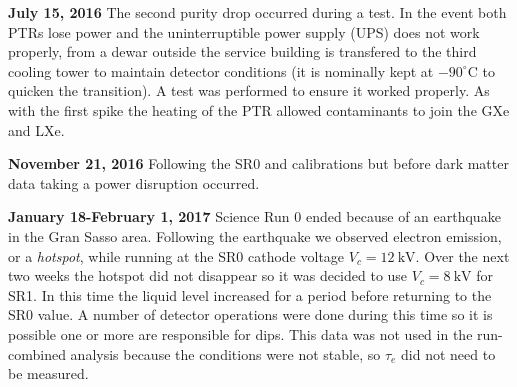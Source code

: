 \textbf{July 15, 2016}  The second purity drop occurred during a \lntwo test.  In the event both PTRs lose power and the uninterruptible
power supply
(UPS) does not work properly, \lntwo from a dewar outside the service building is transfered to the third cooling tower to maintain
detector conditions (it is nominally kept at $-90^{\circ}\mathrm{C}$ to quicken the transition).  A test was performed to ensure it
worked properly.  As with the first spike the heating of the PTR allowed contaminants to join the GXe and LXe.

\begin{table}
\centering
{}
\caption{Purity drops over the lifetime of XENON1T.  Dates and expected causes are listed, along with the detector region (GXe or LXe)
in which the impurity release is thought to occur.  Possible causes and the change in $\tau_e$ from $\alpha$ measurements are given.}
\label{tab:electron_lifetime_model_detector_effects_spikes_dates}
\end{table}

\textbf{November 21, 2016}  Following the SR0 \ambe and \metakr calibrations but before dark matter data taking a power disruption
occurred.

\textbf{January 18-February 1, 2017} Science Run 0 ended because of an earthquake in the Gran Sasso area.  Following the earthquake we
observed electron emission, or a \textit{hotspot}, while running at the SR0 cathode voltage $V_c = 12\ \mathrm{kV}$.  Over the next two
weeks the hotspot did not disappear so it was decided to use $V_c = 8\ \mathrm{kV}$ for SR1.  In this time the liquid level
increased for a period before returning to the SR0 value.  A number of detector operations were done during
this time so it is possible one or more are responsible for dips.  This data was not used in the
run-combined analysis because the conditions were not stable, so $\tau_e$ did not need to be measured.

